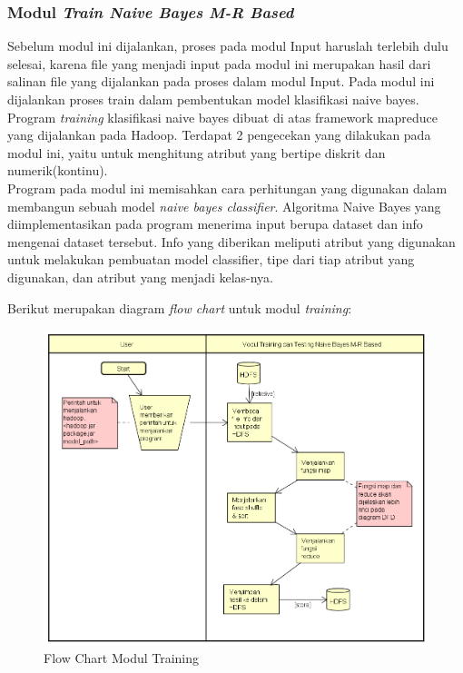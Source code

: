 \subsubsection{Modul \textit{Train Naive Bayes M-R Based}}
\label{subsubsec:Modul Train Naive Bayes M-R Based}

Sebelum modul ini dijalankan, proses pada modul Input haruslah terlebih dulu selesai, karena file yang menjadi input pada modul ini merupakan hasil dari salinan file yang dijalankan pada proses dalam modul Input. Pada modul ini dijalankan proses train dalam pembentukan model klasifikasi naive bayes. Program \textit{training} klasifikasi naive bayes dibuat di atas framework mapreduce yang dijalankan pada Hadoop. Terdapat 2 pengecekan yang dilakukan pada modul ini, yaitu untuk menghitung atribut yang bertipe diskrit dan numerik(kontinu).\\
	Program pada modul ini memisahkan cara perhitungan yang digunakan dalam membangun sebuah model \textit{naive bayes classifier}. Algoritma Naive Bayes yang diimplementasikan pada program menerima input berupa dataset dan info mengenai dataset tersebut. Info yang diberikan meliputi atribut yang digunakan untuk melakukan pembuatan model classifier, tipe dari tiap atribut yang digunakan, dan atribut yang menjadi kelas-nya.
	
Berikut merupakan diagram \textit{flow chart} untuk modul \textit{training}:

\begin{figure}[H]
	\centering
	\includegraphics[scale=0.65]{Diagram/Flowchart_Training_Testing_MR}
	\caption[Flow Chart Modul Training]{Flow Chart Modul Training}
	\label{fig:Flow Chart Modul Training}
\end{figure}

